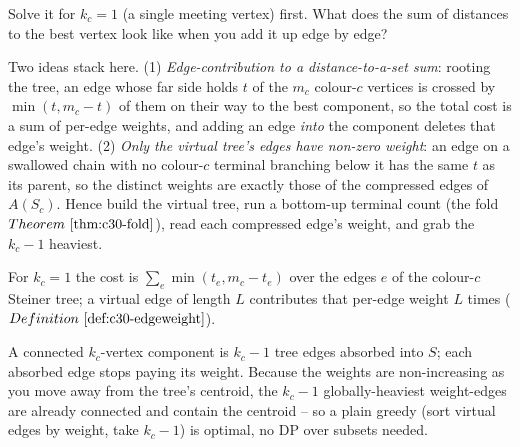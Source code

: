 \begin{attemptgate}
Solve it for \(k_c=1\) (a single meeting vertex) first.  What does the sum of
distances to the best vertex look like when you add it up edge by edge?
\end{attemptgate}

Two ideas stack here.  (1) \emph{Edge-contribution to a distance-to-a-set sum}: rooting
the tree, an edge whose far side holds \(t\) of the \(m_c\) colour-\(c\) vertices is
crossed by \(\min(t,m_c-t)\) of them on their way to the best component, so the total
cost is a sum of per-edge weights, and adding an edge \emph{into} the component deletes
that edge's weight.  (2) \emph{Only the virtual tree's edges have non-zero weight}:
an edge on a swallowed chain with no colour-\(c\) terminal branching below it has the
same \(t\) as its parent, so the distinct weights are exactly those of the compressed
edges of \(A(S_c)\).  Hence build the virtual tree, run a bottom-up terminal count
(the fold \(\thmref{c30-fold}\)), read each compressed edge's weight, and grab the
\(k_c-1\) heaviest.

\begin{observation}
For \(k_c=1\) the cost is \(\sum_{e} \min(t_e, m_c-t_e)\) over the edges \(e\) of the
colour-\(c\) Steiner tree; a virtual edge of length \(L\) contributes that per-edge
weight \(L\) times (\(\defref{c30-edgeweight}\)).
\end{observation}
\begin{observation}
A connected \(k_c\)-vertex component is \(k_c-1\) tree edges absorbed into \(S\); each
absorbed edge stops paying its weight.  Because the weights are non-increasing as you
move away from the tree's centroid, the \(k_c-1\) globally-heaviest weight-edges are
already connected and contain the centroid -- so a plain greedy (sort virtual edges by
weight, take \(k_c-1\)) is optimal, no DP over subsets needed.
\end{observation}

